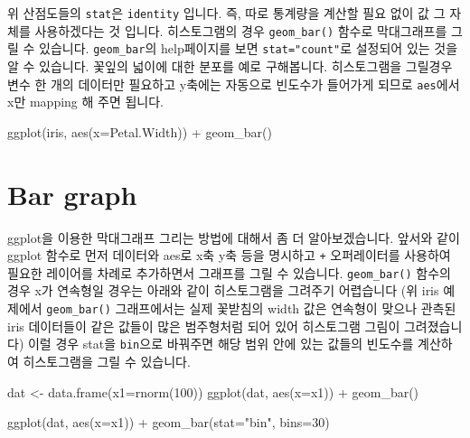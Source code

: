 \documentclass[
]{book}
\newenvironment{Shaded}{\begin{snugshade}}{\end{snugshade}}
\newcommand{\AttributeTok}[1]{\textcolor[rgb]{0.77,0.63,0.00}{#1}}
\newcommand{\DecValTok}[1]{\textcolor[rgb]{0.00,0.00,0.81}{#1}}
\newcommand{\FunctionTok}[1]{\textcolor[rgb]{0.00,0.00,0.00}{#1}}
\newcommand{\NormalTok}[1]{#1}
\newcommand{\OtherTok}[1]{\textcolor[rgb]{0.56,0.35,0.01}{#1}}
\newcommand{\SpecialCharTok}[1]{\textcolor[rgb]{0.00,0.00,0.00}{#1}}
\newcommand{\StringTok}[1]{\textcolor[rgb]{0.31,0.60,0.02}{#1}}
\begin{document}
위 산점도들의 \texttt{stat}은 \texttt{identity} 입니다. 즉, 따로 통계량을 계산할 필요 없이 값 그 자체를 사용하겠다는 것 입니다. 히스토그램의 경우 \texttt{geom\_bar()} 함수로 막대그래프를 그릴 수 있습니다. \texttt{geom\_bar}의 help페이지를 보면 \texttt{stat="count"}로 설정되어 있는 것을 알 수 있습니다. 꽃잎의 넓이에 대한 분포를 예로 구해봅니다. 히스토그램을 그릴경우 변수 한 개의 데이터만 필요하고 y축에는 자동으로 빈도수가 들어가게 되므로 \texttt{aes}에서 x만 mapping 해 주면 됩니다.

\begin{Shaded}
\begin{Highlighting}[]
\FunctionTok{ggplot}\NormalTok{(iris, }\FunctionTok{aes}\NormalTok{(}\AttributeTok{x=}\NormalTok{Petal.Width)) }\SpecialCharTok{+}  
  \FunctionTok{geom\_bar}\NormalTok{()}
\end{Highlighting}
\end{Shaded}

\hypertarget{bar-graph}{%
\section{Bar graph}\label{bar-graph}}

ggplot을 이용한 막대그래프 그리는 방법에 대해서 좀 더 알아보겠습니다. 앞서와 같이 ggplot 함수로 먼저 데이터와 aes로 x축 y축 등을 명시하고 \texttt{+} 오퍼레이터를 사용하여 필요한 레이어를 차례로 추가하면서 그래프를 그릴 수 있습니다. \texttt{geom\_bar()} 함수의 경우 x가 연속형일 경우는 아래와 같이 히스토그램을 그려주기 어렵습니다 (위 iris 예제에서 \texttt{geom\_bar()} 그래프에서는 실제 꽃받침의 width 값은 연속형이 맞으나 관측된 iris 데이터들이 같은 값들이 많은 범주형처럼 되어 있어 히스토그램 그림이 그려졌습니다) 이럴 경우 stat을 \texttt{bin}으로 바꿔주면 해당 범위 안에 있는 값들의 빈도수를 계산하여 히스토그램을 그릴 수 있습니다.

\begin{Shaded}
\begin{Highlighting}[]
\NormalTok{dat }\OtherTok{\textless{}{-}} \FunctionTok{data.frame}\NormalTok{(}\AttributeTok{x1=}\FunctionTok{rnorm}\NormalTok{(}\DecValTok{100}\NormalTok{))}
\FunctionTok{ggplot}\NormalTok{(dat, }\FunctionTok{aes}\NormalTok{(}\AttributeTok{x=}\NormalTok{x1)) }\SpecialCharTok{+}
  \FunctionTok{geom\_bar}\NormalTok{()}

\FunctionTok{ggplot}\NormalTok{(dat, }\FunctionTok{aes}\NormalTok{(}\AttributeTok{x=}\NormalTok{x1)) }\SpecialCharTok{+}
  \FunctionTok{geom\_bar}\NormalTok{(}\AttributeTok{stat=}\StringTok{"bin"}\NormalTok{, }\AttributeTok{bins=}\DecValTok{30}\NormalTok{)}
\end{Highlighting}
\end{Shaded}
\end{document}
